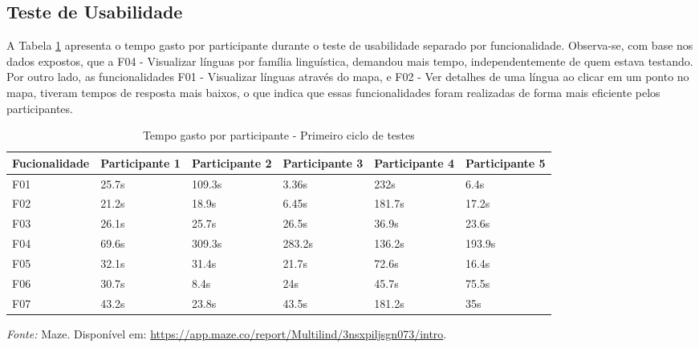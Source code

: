 \subsection{Teste de Usabilidade}
\label{sec:Primeiro Teste de Usabilidade}
A Tabela \ref{tab06} apresenta o tempo gasto por participante durante o teste de usabilidade separado por funcionalidade. Observa-se, com base nos dados expostos, que a F04 - Visualizar línguas por família linguística, 
demandou mais tempo, independentemente de quem estava testando. Por outro lado, as funcionalidades F01 - Visualizar línguas através do mapa, e F02 - Ver detalhes de uma língua ao clicar em um ponto no mapa, tiveram tempos 
de resposta mais baixos, o que indica que essas funcionalidades foram realizadas de forma mais eficiente pelos participantes.

\begin{table}[h!]
	\centering
	\caption{Tempo gasto por participante - Primeiro ciclo de testes}
	\label{tab06}
	\begin{adjustbox}{center}
	\begin{tabular}{l|l|l|l|l|l}
	\hline
	Fucionalidade & Participante 1 & Participante 2 & Participante 3 & Participante 4 & Participante 5 \\ 	\hline
	F01                   & 25.7s     & 109.3s     & 3.36s      & 232s       & 6.4s      \\
	F02                   & 21.2s        & 18.9s      & 6.45s      & 181.7s    & 17.2s     \\
	F03                   & 26.1s        & 25.7s      & 26.5s      & 36.9s     & 23.6s     \\
	F04                   & 69.6s        & 309.3s     & 283.2s     & 136.2s     & 193.9s     \\
	F05                   & 32.1s      & 31.4s      & 21.7s     & 72.6s     & 16.4s     \\
	F06                   & 30.7s     & 8.4s      & 24s     & 45.7s     & 75.5s     \\
	F07                   & 43.2s     & 23.8s      & 43.5s     & 181.2s    & 35s      \\ 	\hline
	\end{tabular}
	\end{adjustbox}
	\begin{tablenotes}[flushleft]
		\centering
		\item \textit{Fonte:} Maze. Disponível em: \url{https://app.maze.co/report/Multilind/3nsxpiljsgn073/intro}.
	  \end{tablenotes}
\end{table}

